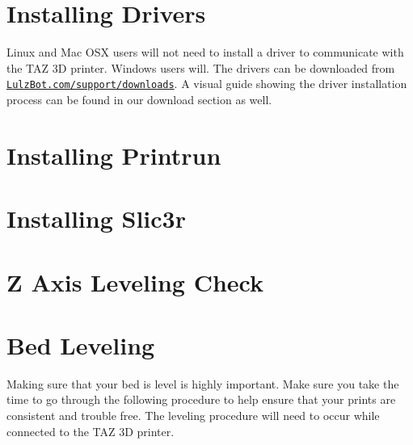 \section{Installing Drivers}
\item Linux and Mac OSX users will not need to install a driver to communicate with the TAZ 3D printer. Windows users will. The drivers can be downloaded from \texttt{\href{https://www.lulzbot.com/support/downloads}{LulzBot.com/support/downloads}}. A visual guide showing the driver installation process can be found in our download section as well.

\section{Installing Printrun}
\item

\section{Installing Slic3r}
\item

\index
\section{Z Axis Leveling Check}
\item


\section{Bed Leveling}
\item Making sure that your bed is level is highly important. Make sure you take the time to go through the following procedure to help ensure that your prints are consistent and trouble free. The leveling procedure will need to occur while connected to the TAZ 3D printer. 
